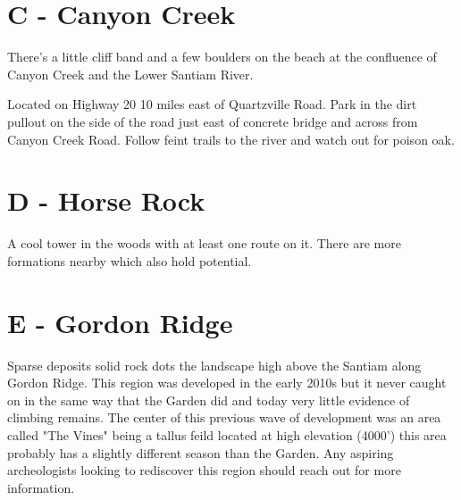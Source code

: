 \begin{multicols}{2}
\needspace{5cm}

\section{C - Canyon Creek}\label{sa:Canyon Creek}
There's a little cliff band and a few boulders on the beach at the confluence of Canyon Creek and the Lower Santiam River.

Located on Highway 20 10 miles east of Quartzville Road. Park in the dirt pullout on the side of the road just east of concrete bridge and across from Canyon Creek Road. Follow feint trails to the river and watch out for poison oak.\\




\needspace{5cm}

\section{D - Horse Rock}\label{sa:Horse Rock}
A cool tower in the woods with at least one route on it. There are more formations nearby which also hold potential.\\




\needspace{5cm}

\section{E - Gordon Ridge}\label{sa:Gordon Ridge}
Sparse deposits solid rock dots the landscape high above the Santiam along Gordon Ridge. This region was developed in the early 2010s but it never caught on in the same way that the Garden did and today very little evidence of climbing remains. The center of this previous wave of development was an area called "The Vines" being a tallus feild located at high elevation (4000') this area probably has a slightly different season than the Garden. Any aspiring archeologists looking to rediscover this region should reach out for more information.\\





\end{multicols}
